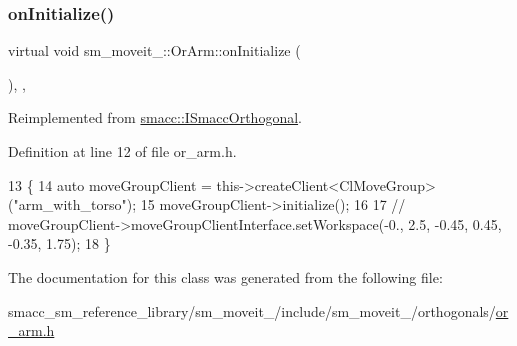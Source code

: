 \subsubsection{\texorpdfstring{on\+Initialize()}{onInitialize()}}
{\footnotesize\ttfamily virtual void sm\+\_\+moveit\+\_\+::\+Or\+Arm\+::on\+Initialize (\begin{DoxyParamCaption}{ }\end{DoxyParamCaption})\hspace{0.3cm}{\ttfamily [inline]}, {\ttfamily [override]}, {\ttfamily [virtual]}}



Reimplemented from \hyperlink{classsmacc_1_1ISmaccOrthogonal_a6bb31c620cb64dd7b8417f8705c79c7a}{smacc\+::\+I\+Smacc\+Orthogonal}.



Definition at line 12 of file or\+\_\+arm.\+h.


\begin{DoxyCode}
13         \{
14             \textcolor{keyword}{auto} moveGroupClient = this->createClient<ClMoveGroup>(\textcolor{stringliteral}{"arm\_with\_torso"});
15             moveGroupClient->initialize();
16 
17             \textcolor{comment}{// moveGroupClient->moveGroupClientInterface.setWorkspace(-0., 2.5, -0.45, 0.45, -0.35, 1.75);}
18         \}
\end{DoxyCode}


The documentation for this class was generated from the following file\+:\begin{DoxyCompactItemize}
\item 
smacc\+\_\+sm\+\_\+reference\+\_\+library/sm\+\_\+moveit\+\_/include/sm\+\_\+moveit\+\_/orthogonals/\hyperlink{4_2include_2sm__moveit__4_2orthogonals_2or__arm_8h}{or\+\_\+arm.\+h}\end{DoxyCompactItemize}
